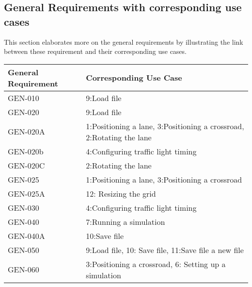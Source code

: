 
\subsection{General Requirements with corresponding use cases}
This section elaborates more on the general requirements by illustrating the link between these requirement and their corresponding use cases. 

\begin{tabularx}{\textwidth}{|p{4cm}|X|}\hline
	\textbf{General Requirement} & \textbf{Corresponding Use Case }\\\hline
	GEN-010&9:Load file\\ \hline
	GEN-020&9:Load file\\ \hline
	GEN-020A&1:Positioning a lane, 3:Positioning a crossroad, 2:Rotating the lane \\ \hline
	GEN-020b&4:Configuring traffic light timing\\ \hline
	GEN-020C&2:Rotating the lane \\ \hline
	GEN-025&1:Positioning a lane, 3:Positioning a crossroad\\ \hline
	GEN-025A&12: Resizing the grid \\ \hline
	GEN-030&4:Configuring traffic light timing\\ \hline
	GEN-040&7:Running a simulation\\ \hline
	GEN-040A&10:Save file\\ \hline
	GEN-050&9:Load file, 10: Save file, 11:Save file a new file\\ \hline
	GEN-060&3:Positioning a crossroad, 6: Setting up a simulation\\ \hline
\end{tabularx}

